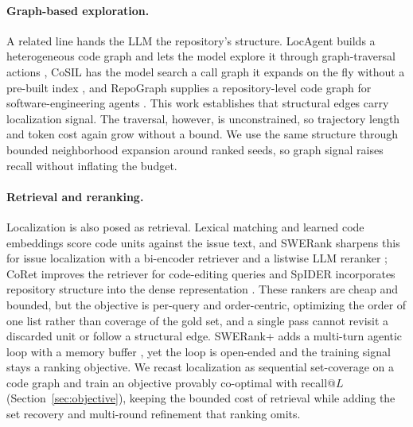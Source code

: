 \paragraph{Graph-based exploration.}
A related line hands the LLM the repository's structure.
LocAgent builds a heterogeneous code graph and lets the model
explore it through graph-traversal actions \citep{chen2025locagent},
CoSIL has the model search a call graph it expands on the fly
without a pre-built index
\citep{jiang2025cosilsoftwareissuelocalization}, and RepoGraph
supplies a repository-level code graph for software-engineering
agents \citep{ouyang2025repograph}. This work establishes that
structural edges carry localization signal. The traversal,
however, is unconstrained, so trajectory length and token cost
again grow without a bound. We use the same structure through
bounded neighborhood expansion around ranked seeds, so graph
signal raises recall without inflating the budget.

\paragraph{Retrieval and reranking.}
Localization is also posed as retrieval. Lexical matching
\citep{Robertson1994OkapiATBM25} and learned code embeddings
\citep{feng-etal-2020-codebert,
guo2021graphcodebertpretrainingcoderepresentations,
zhang2024codesage} score code units against the issue text, and
SWERank sharpens this for issue localization with a bi-encoder
retriever and a listwise LLM reranker
\citep{reddy2025sweranksoftwareissuelocalization}; CoRet
improves the retriever for code-editing queries
\citep{fehr-etal-2025-coret} and SpIDER incorporates repository
structure into the dense representation \citep{chaudhari2025spider}.
These rankers are cheap and bounded, but the objective is
per-query and order-centric, optimizing the order of one list
rather than coverage of the gold set, and a single pass cannot
revisit a discarded unit or follow a structural edge. SWERank+
adds a multi-turn agentic loop with a memory buffer
\citep{swerankplus2025}, yet the loop is open-ended and the
training signal stays a ranking objective. We recast
localization as sequential set-coverage on a code graph and
train an objective provably co-optimal with recall@$L$
(Section~\ref{sec:objective}), keeping the bounded cost of
retrieval while adding the set recovery and multi-round
refinement that ranking omits.
